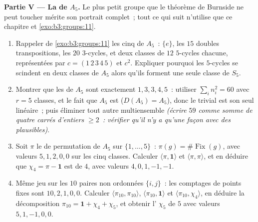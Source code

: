 \begin{problem}
\medskip
\noindent\textbf{Partie V --- La  de $A_5$.} Le
plus petit groupe que le théorème de Burnside ne peut toucher
mérite son portrait complet~; tout ce qui suit n'utilise que ce
chapitre et \cref{exo:b3:groups:11}.
\begin{enumerate}[resume]
  \item Rappeler de \cref{exo:b3:groups:11} les cinq  de $A_5$~: $\{e\}$, les $15$ doubles
        transpositions, les $20$ $3$-cycles, et deux classes de
        $12$ $5$-cycles chacune, représentées par $c =
        (1\,2\,3\,4\,5)$ et $c^2$. Expliquer pourquoi les
        $5$-cycles se scindent en deux classes de $A_5$ alors
        qu'ils forment une seule classe de $S_5$.
  \item Montrer que les   de $A_5$ sont
        exactement $1, 3, 3, 4, 5$~: utiliser $\sum_in_i^2 = 60$
        avec $r = 5$ classes, et le fait que $A_5$ est 
        ($D(A_5) = A_5$), donc le  trivial est son
        seul linéaire~; puis éliminer tout autre multiensemble
        \emph{(écrire $59$ comme somme de quatre carrés d'entiers
        $\geq 2$~: vérifier qu'il n'y a qu'une façon avec des
         plausibles)}.
  \item Soit $\pi$ le  de permutation de $A_5$ sur
        $\{1, \dots, 5\}$~: $\pi(g) = \#\operatorname{Fix}(g)$,
        avec valeurs $5, 1, 2, 0, 0$ sur les cinq classes.
        Calculer $\langle\pi, \mathbf 1\rangle$ et $\langle\pi,
        \pi\rangle$, et en déduire que $\chi_4 = \pi - \mathbf 1$
        est  de  $4$, avec valeurs $4, 0, 1,
        -1, -1$.
  \item Même jeu sur les $10$ paires non ordonnées $\{i, j\}$~:
        les comptages de points fixes sont $10, 2, 1, 0, 0$.
        Calculer $\langle\pi_{10}, \pi_{10}\rangle$,
        $\langle\pi_{10}, \mathbf 1\rangle$ et
        $\langle\pi_{10}, \chi_4\rangle$, en déduire la
        décomposition $\pi_{10} = \mathbf 1 + \chi_4 +
        \chi_5$, et obtenir l' $\chi_5$ de  $5$
        avec valeurs $5, 1, -1, 0, 0$.

\end{enumerate}
\end{problem}
